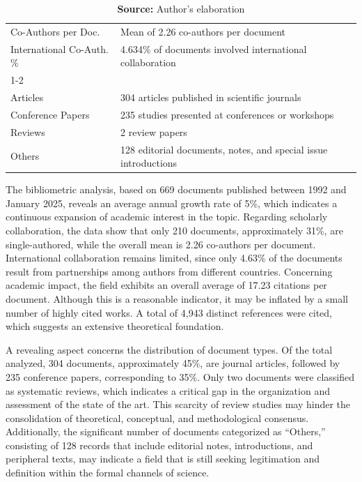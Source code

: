 \begin{table}[ht!]
\begin{tabular}{p{3.5cm}p{10.5cm}}
Co-Authors per Doc. & Mean of 2.26 co-authors per document
\\

International Co-Auth. \% & 4.634\% of documents involved international collaboration
\\

\cmidrule[0.4pt]{1-2}
\rowcolor{gray!10}
\multicolumn{2}{l}{\textbf{Document Types}}
\\

Articles & 304 articles published in scientific journals
\\

Conference Papers & 235 studies presented at conferences or workshops
\\

Reviews & 2 review papers
\\

Others & 128 editorial documents, notes, and special issue introductions
\\

\bottomrule
\end{tabular}
\label{tab:resumo_analise_bibliometrica}
\caption*{\textbf{Source:} Author’s elaboration}
\end{table}


The bibliometric analysis, based on 669 documents published between 1992 and January 2025, reveals an average annual growth rate of 5\%, which indicates a continuous expansion of academic interest in the topic. Regarding scholarly collaboration, the data show that only 210 documents, approximately 31\%, are single-authored, while the overall mean is 2.26 co-authors per document. International collaboration remains limited, since only 4.63\% of the documents result from partnerships among authors from different countries. Concerning academic impact, the field exhibits an overall average of 17.23 citations per document. Although this is a reasonable indicator, it may be inflated by a small number of highly cited works. A total of 4,943 distinct references were cited, which suggests an extensive theoretical foundation.

A revealing aspect concerns the distribution of document types. Of the total analyzed, 304 documents, approximately 45\%, are journal articles, followed by 235 conference papers, corresponding to 35\%. Only two documents were classified as systematic reviews, which indicates a critical gap in the organization and assessment of the state of the art. This scarcity of review studies may hinder the consolidation of theoretical, conceptual, and methodological consensus. Additionally, the significant number of documents categorized as ``Others,'' consisting of 128 records that include editorial notes, introductions, and peripheral texts, may indicate a field that is still seeking legitimation and definition within the formal channels of science.

